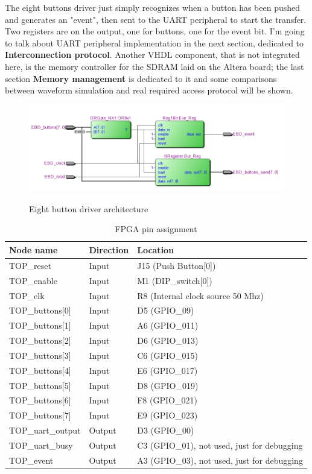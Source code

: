 The eight buttons driver just simply recognizes when a button has been pushed and generates an "event", then sent to the UART peripheral to start the transfer. Two registers are on the output, one for buttons, one for the event bit.
\newline
\newline
I'm going to talk about UART peripheral implementation in the next section, dedicated to \textbf{Interconnection protocol}. Another VHDL component, that is not integrated here, is the memory controller for the SDRAM laid on the Altera board; the last section \textbf{Memory management} is dedicated to it and some comparisons between waveform simulation and real required access protocol will be shown.

 \begin{figure}[H]
\centering
\includegraphics[scale=.8]{Immagini/18}
\label{18}
\caption{Eight button driver architecture}
\end{figure}

\begin{table}[H]
\centering
\begin{tabular}{p{}p{}p{}}

\textbf{Node name}&\textbf{Direction}&\textbf{Location}\\ \hline
TOP\_reset & Input & J15 (Push Button[0])\\
TOP\_enable& Input & M1 (DIP\_switch[0])\\
TOP\_clk	&Input & R8 (Internal clock source 50 Mhz)\\
TOP\_buttons[0]	& Input & D5 (GPIO\_09)\\ 
TOP\_buttons[1]	& Input & A6 (GPIO\_011)\\ 
TOP\_buttons[2]	& Input & D6 (GPIO\_013)\\ 
TOP\_buttons[3]	& Input & C6 (GPIO\_015)\\ 
TOP\_buttons[4]	& Input & E6 (GPIO\_017)\\ 
TOP\_buttons[5]	& Input & D8 (GPIO\_019)\\ 
TOP\_buttons[6]	& Input & F8 (GPIO\_021)\\ 
TOP\_buttons[7]	& Input & E9 (GPIO\_023)\\ 
TOP\_uart\_output & Output & D3 (GPIO\_00)\\
TOP\_uart\_busy	  & Output & C3 (GPIO\_01), not used, just for debugging\\
TOP\_event		& Output	& A3 (GPIO\_03), not used, just for debugging\\
\hline
\end{tabular}
\caption{FPGA pin assignment}
\end{table}

